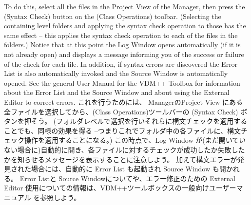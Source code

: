 \documentclass[\pformat,12pt]{jarticle}
\newcommand{\guicmd}[1]{{\sf #1}}
\begin{document}
To do this, select all the files in the \guicmd{Project View} 
of the \guicmd{Manager}, then press the 
(\guicmd{Syntax Check}) button on the (\guicmd{Class Operations})
toolbar. (Selecting the containing level folders and
applying the syntax check operation to those  has the same effect --
this applies the syntax check operation to each of the  files in the folders.) 
Notice that at this point the \guicmd{Log Window} opens automatically
(if it is not already open) and displays a message informing you of
the success or failure of the check for each file. In addition, if
syntax errors are discovered the \guicmd{Error List} is
also au\-to\-matically invoked and the \guicmd{Source Window} is
automatically opened. See the general User Manual for the VDM++
Toolbox \cite{UserManPP-SCSK} for information about the \guicmd{Error List}
and the \guicmd{Source Window} and about using the \guicmd{External
  Editor} to correct errors.
これを行うためには、 \guicmd{Manager}の\guicmd{Project View} にある全ファイルを選択してから、(\guicmd{Class Operations})ツールバーの  (\guicmd{Syntax Check}) ボタンを押そう。
(フォルダレベルで選択を行いそれらに構文チェックを適用することでも、同様の効果を得る --つまりこれでフォルダ中の各ファイルに、構文チェック操作を適用することになる。) 
この時点で、\guicmd{Log Window} が(まだ開いていない場合に)自動的に開き、各ファイルに対するチェックが成功したか失敗したかを知らせるメッセージを表示することに注意しよう。
加えて構文エラーが発見された場合には、自動的に \guicmd{Error List} も起動され \guicmd{Source Window} も開かれる。 
 \guicmd{Error List}と \guicmd{Source Window}についてや、エラー修正のための \guicmd{External Editor} 使用についての情報は、VDM++ツールボックスの一般向けユーザーマニュアル \cite{UserManPP-SCSK} を参照しよう。
\end{document}
